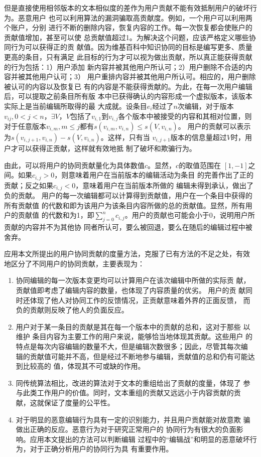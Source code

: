 但是直接使用相邻版本的文本相似度的差作为用户贡献不能有效抵制用户的破坏行为。恶意用户
也可以利用算法的漏洞骗取高贡献度。例如，一个用户可以利用两个账户，分别
进行不断的删除内容，恢复内容的工作。每一次恢复都会使账户的贡献值增加，甚至可以使
总贡献值超过1。为解决这个问题，应该严格定义哪些协同行为可以获得正的贡
献值。因为维基百科中知识协同的目标是编写更多、质量更高的条目，只有满足
此目标的行为才可以视为做出贡献，所以真正能获得贡献的行为包括：1）用户添加
新内容并被其他用户所认可；2）用户删除不合适的内容并被其他用户认可；3）
用户重排内容并被其他用户所认可。相应的，用户删除被认可的内容以及恢复已
有的内容是不能获得贡献的。为此，在每一次用户编辑后，可以提取之前条目所有版
本中已获得确认的内容形成一个虚拟版本，该版本实际上是当前编辑所取得的最
大成就。设条目$e_i$经过了$n$次编辑，对于版本$v_{ij}, 0<j<n$，$\exists
V$，$V$包括了$v_{i,1}$到$v_{i,j}$各个版本中被接受的内容和其相对位置，则
对于任意版本$v_{i,m},m \leq j$都有$s(v_{i,m},v_{i,n}) \leq s(V,v_{i,n})$。
用户的贡献可以表示为$s(v_{i,j+1},v_{i,n})-s(V,v_{i,n})$。这样，只有当
$v_{i,j+1}$版本的信息量超过$V$时，用户才可以获得正贡献，这样就有效地抵
制了破坏和欺骗行为。

由此，可以将用户的协同贡献量化为具体数值$c$。显然，$c$的取值范围在
$[1,-1]$之间。如果$c_{i,j}>0$，则意味着用户在当前版本的编辑活动为条目
的完善作出了正的贡献；反之如果$c_{i,j}<0$，意味着用户在当前版本所做的
编辑未得到承认，做出了负的贡献。
用户的每一次编辑都可以计算得到贡献值，用户在一个条目中获得的所有贡献值
的代数和即为该用户为该条目内容所做的总的贡献值。显然，所有用户的贡献值
的代数和为1，即$\sum_{j=0}^{n}c_{i,j}$。用户的贡献也可能会小于0，说明用户所贡献的内容并不为其他协
同者所认可，要么被回退，要么在随后的编辑过程中被舍弃。

应用本文所提出的用户协同贡献的度量方法，克服了已有方法的不足之处，有效
地区分了不同用户的协同贡献，主要表现为：
\begin{enumerate}
\item 协同编辑的每一次版本变更均可以计算用户在该次编辑中所做的实际贡
  献，贡献值即考虑了编辑内容的数量，也体现了内容质量的优劣。 用户的贡
  献同时还体现了他人对协同工作的反馈情况，正贡献意味着外界的正面反馈，
  而负的贡献则反映了他人的负面反应。
\item 用户对于某一条目的贡献是其在每一个版本中的贡献的总和，这对于那些
  以维护 条目内容为主要工作的用户来说，能够恰当地体现其贡献。这些用户
  的特点是每次内容编辑的数量不大，但是编辑次数很多；因此，尽管其每次编
  辑的贡献值可能并不高，但是经过不断地参与编辑，贡献值的总和仍有可能达到比较高的
  值，体现其不可或缺的作用。
\item 同传统算法相比，改进的算法对于文本的重组给出了贡献的度量，体现了
  参与此类工作用户的价值。同时，文本重组的贡献又远远小于内容贡献的贡
  献，这就保证了度量的公平性。
\item 对于明显的恶意编辑行为具有一定的识别能力，并且用户贡献能对故意欺
  骗做出正确的反应。恶意行为对于研究正常用户的
  协同行为有很大的负面影响。应用本文提出的方法可以判断编辑
  过程中的“编辑战”和明显的恶意破坏行为，对于正确分析用户的协同行为具
  有重要作用。
\end{enumerate}
 
